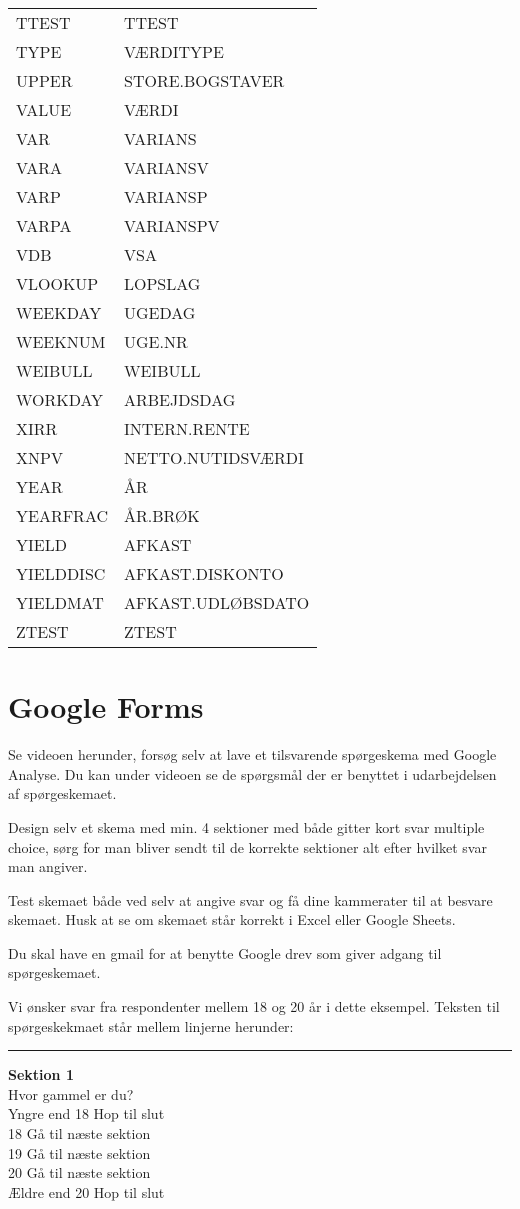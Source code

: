 \documentclass[
]{book}
\begin{document}
\begin{longtable}[]{@{}ll@{}}
TTEST & TTEST\tabularnewline
TYPE & VÆRDITYPE\tabularnewline
UPPER & STORE.BOGSTAVER\tabularnewline
VALUE & VÆRDI\tabularnewline
VAR & VARIANS\tabularnewline
VARA & VARIANSV\tabularnewline
VARP & VARIANSP\tabularnewline
VARPA & VARIANSPV\tabularnewline
VDB & VSA\tabularnewline
VLOOKUP & LOPSLAG\tabularnewline
WEEKDAY & UGEDAG\tabularnewline
WEEKNUM & UGE.NR\tabularnewline
WEIBULL & WEIBULL\tabularnewline
WORKDAY & ARBEJDSDAG\tabularnewline
XIRR & INTERN.RENTE\tabularnewline
XNPV & NETTO.NUTIDSVÆRDI\tabularnewline
YEAR & ÅR\tabularnewline
YEARFRAC & ÅR.BRØK\tabularnewline
YIELD & AFKAST\tabularnewline
YIELDDISC & AFKAST.DISKONTO\tabularnewline
YIELDMAT & AFKAST.UDLØBSDATO\tabularnewline
ZTEST & ZTEST\tabularnewline
\bottomrule
\end{longtable}

\hypertarget{google-forms}{%
\chapter{Google Forms}\label{google-forms}}

Se videoen herunder, forsøg selv at lave et tilsvarende spørgeskema med Google Analyse. Du kan under videoen se de spørgsmål der er benyttet i udarbejdelsen af spørgeskemaet.

\begin{embed-container}

\end{embed-container}

Design selv et skema med min. 4 sektioner med både gitter kort svar multiple choice, sørg for man bliver sendt til de korrekte sektioner alt efter hvilket svar man angiver.

Test skemaet både ved selv at angive svar og få dine kammerater til at besvare skemaet. Husk at se om skemaet står korrekt i Excel eller Google Sheets.

Du skal have en gmail for at benytte Google drev som giver adgang til spørgeskemaet.

Vi ønsker svar fra respondenter mellem 18 og 20 år i dette eksempel. Teksten til spørgeskekmaet står mellem linjerne herunder:

\begin{center}\rule{0.5\linewidth}{0.5pt}\end{center}

\textbf{Sektion 1}\\
Hvor gammel er du?\\
Yngre end 18 Hop til slut\\
18 Gå til næste sektion\\
19 Gå til næste sektion\\
20 Gå til næste sektion\\
Ældre end 20 Hop til slut
\end{document}
